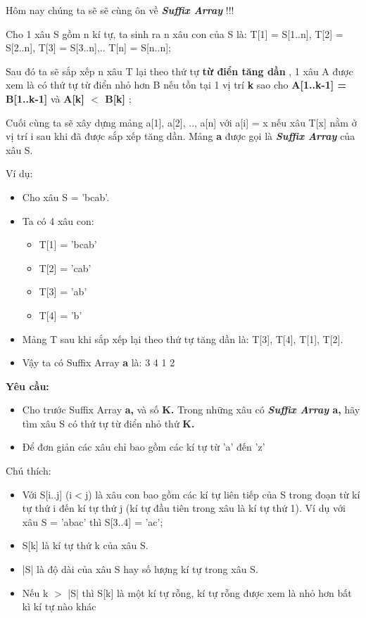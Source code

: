 



   Hôm nay chúng ta sẽ sẽ cùng ôn về   \emph{\textbf{     Suffix Array    }}   !!!  

   Cho 1 xâu S gồm n kí tự, ta sinh ra n xâu con của S là: T[1] = S[1..n], T[2] = S[2..n], T[3] = S[3..n],.. T[n] = S[n..n];  

   Sau đó ta sẽ sắp xếp n xâu T lại theo thứ tự   \textbf{    từ điển tăng dần   }   , 1 xâu A được xem là có thứ tự từ điển nhỏ hơn B nếu tồn tại 1 vị trí   \textbf{    k   }   sao cho   \textbf{    A[1..k-1] = B[1..k-1]   }   và   \textbf{    A[k] $<$ B[k]   }   ;  

   Cuối cùng ta sẽ xây dựng mảng a[1], a[2], .., a[n] với a[i] = x nếu xâu T[x] nằm ở vị trí i sau khi đã được sắp xếp tăng dần. Mảng   \textbf{    a   }   được gọi là   \emph{\textbf{     Suffix Array    }}   của xâu S.  

   Ví dụ:  
\begin{itemize}
	\item     Cho xâu S = 'bcab'.   
	\item     Ta có 4 xâu con:    
\begin{itemize}
	\item       T[1] = 'bcab'     
	\item       T[2] = 'cab'     
	\item       T[3] = 'ab'     
	\item       T[4] = 'b'     
\end{itemize}
	\item     Mảng T sau khi sắp xếp lại theo thứ tự tăng dần là: T[3], T[4], T[1], T[2].   
	\item     Vậy ta có Suffix Array    \textbf{     a    }    là: 3 4 1 2   
\end{itemize}
\begin{enumerate}
\end{enumerate}

\textbf{    Yêu cầu:   }
\begin{itemize}
	\item     Cho trước Suffix Array    \textbf{     a,    }    và số    \textbf{     K.    }    Trong những xâu có    \textbf{\emph{      Suffix Array     }     a,    }    hãy tìm xâu S có thứ tự từ điển nhỏ thứ    \textbf{     K.    }
	\item     Để đơn giản các xâu chỉ bao gồm các kí tự từ 'a' đến 'z'   
\end{itemize}

   Chú thích:  
\begin{itemize}
	\item     Với S[i..j] (i$<$j) là xâu con bao gồm các kí tự liên tiếp của S trong đoạn từ kí tự thứ i đến kí tự thứ j (kí tự đầu tiên trong xâu là kí tự thứ 1). Ví dụ với xâu S = 'abac' thì S[3..4] = 'ac';   
	\item     S[k] là kí tự thứ k của xâu S.   
	\item     |S| là độ dài của xâu S hay số lượng kí tự trong xâu S.   
	\item     Nếu k $>$ |S| thì S[k] là một kí tự rỗng, kí tự rỗng được xem là nhỏ hơn bất kì kí tự nào khác   
\end{itemize}


